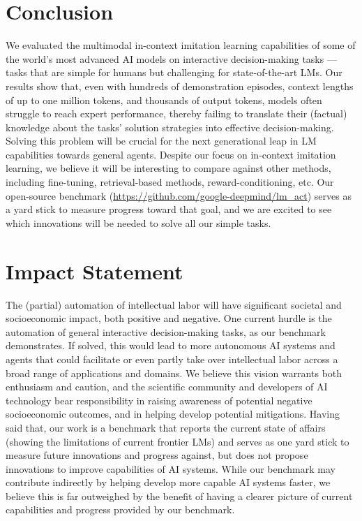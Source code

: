 \documentclass{article}
\begin{document}
    \section{Conclusion}
\label{sec:conclusion}
We evaluated the multimodal in-context imitation learning capabilities of some of the world's most advanced AI models on interactive decision-making tasks --- tasks that are simple for humans but challenging for state-of-the-art LMs.
Our results show that, even with hundreds of demonstration episodes, context lengths of up to one million tokens, and thousands of output tokens, models often struggle to reach expert performance, thereby failing to translate their (factual) knowledge about the tasks' solution strategies into effective decision-making.
Solving this problem will be crucial for the next generational leap in LM capabilities towards general agents.
Despite our focus on in-context imitation learning, we believe it will be interesting to compare against other methods, including fine-tuning, retrieval-based methods, reward-conditioning, etc.
Our open-source benchmark (\url{https://github.com/google-deepmind/lm_act}) serves as a yard stick to measure progress toward that goal, and we are excited to see which innovations will be needed to solve all our simple tasks.
    \section*{Impact Statement}
The (partial) automation of intellectual labor will have significant societal and socioeconomic impact, both positive and negative.
One current hurdle is the automation of general interactive decision-making tasks, as our benchmark demonstrates.
If solved, this would lead to more autonomous AI systems and agents that could facilitate or even partly take over intellectual labor across a broad range of applications and domains.
We believe this vision warrants both enthusiasm and caution, and the scientific community and developers of AI technology bear responsibility in raising awareness of potential negative socioeconomic outcomes, and in helping develop potential mitigations.
Having said that, our work is a benchmark that reports the current state of affairs (showing the limitations of current frontier LMs) and serves as one yard stick to measure future innovations and progress against, but does not propose innovations to improve capabilities of AI systems.
While our benchmark may contribute indirectly by helping develop more capable AI systems faster, we believe this is far outweighed by the benefit of having a clearer picture of current capabilities and progress provided by our benchmark.
\end{document}
